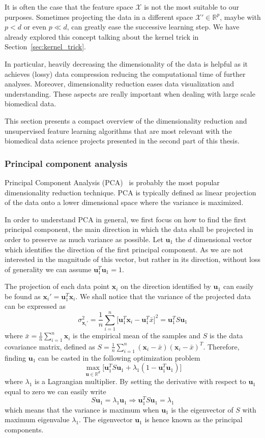 	It is often the case that the feature space $\mathcal{X}$ is not the most suitable to our purposes. Sometimes projecting the data in a different space $\mathcal{X}' \in \mathbb{R}^p$, maybe with $p<d$ or even $p \ll d$, can greatly ease the successive learning step. We have already explored this concept talking about the kernel trick in Section~\ref{sec:kernel_trick}.
	
	In particular, heavily decreasing the dimensionality of the data is helpful as it achieves (lossy) data compression reducing the computational time of further analyses. Moreover, dimensionality reduction eases data visualization and understanding. These aspects are really important when dealing with large scale biomedical data.
	
	This section presents a compact overview of the dimensionality reduction and unsupervised feature learning algorithms that are most relevant with the biomedical data science projects presented in the second part of this thesis.
	
	\subsubsection{Principal component analysis} \label{sec:pca}
	
	Principal Component Analysis (\ac{PCA})~\cite{bishop2006pattern} is probably the most popular dimensionality reduction technique. PCA is typically defined as linear projection of the data onto a lower dimensional space where the variance is maximized.
	
	In order to understand PCA in general, we first focus on how to find the first principal component, \ie the main direction in which the data shall be projected in order to preserve as much variance as possible. Let $\bm{u}_1$ the $d$ dimensional vector which identifies the direction of the first principal component. As we are not interested in the magnitude of this vector, but rather in its direction, without loss of generality we can assume $\bm{u}_1^T\bm{u}_1 = 1$.
	
	The projection of each data point $\bm{x}_i$ on the direction identified by $\bm{u}_1$ can easily be found as $\bm{x}_i' = \bm{u}_1^T\bm{x}_i$. We shall notice that the variance of the projected data can be expressed as
	$$
	\sigma^2_{\bm{x}_i'} = \frac{1}{n} \sum_{i=1}^n \big[\bm{u}_1^T\bm{x}_i - \bm{u}_1^T\bar{x}\big]^2 = \bm{u}_1^T S \bm{u}_1
	$$
	where $\bar{x} = \frac{1}{n} \sum_{i=1}^n \bm{x}_i$ is the empirical mean of the samples and $S$ is the data covariance matrix, defined as $S = \frac{1}{n} \sum_{i=1}^n (\bm{x}_i - \bar{x})(\bm{x}_i - \bar{x})^T$. Therefore, finding $\bm{u}_1$ can be casted in the following optimization problem
	$$
	\max_{\bm{u} \in \mathbb{R}^d} \big[ \bm{u}_1^T S \bm{u}_1 + \lambda_1 (1 - \bm{u}_1^T  \bm{u}_1) \big]
	$$
	where $\lambda_1$ is a Lagrangian multiplier. By setting the derivative with respect to $\bm{u}_1$ equal to zero we can easily write
	$$
	S \bm{u}_1 = \lambda_1 \bm{u}_1 \Rightarrow \bm{u}_1^T S \bm{u}_1 = \lambda_1
	$$
	which means that the variance is maximum when $\bm{u}_1$ is the eigenvector of $S$ with maximum eigenvalue $\lambda_1$. The eigenvector $\bm{u}_1$ is hence known as the principal components.
	

